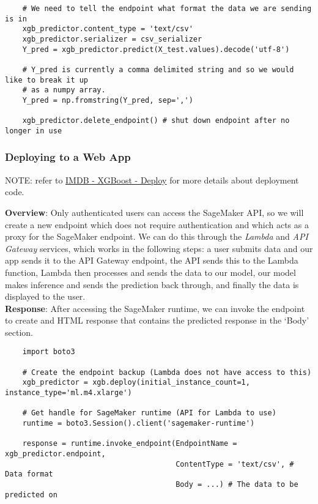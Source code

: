 \documentclass[11pt, a4paper]{article}
\begin{document}
\begin{spacing}{1.1}
\begin{lstlisting}
	# We need to tell the endpoint what format the data we are sending is in
	xgb_predictor.content_type = 'text/csv'
	xgb_predictor.serializer = csv_serializer
	Y_pred = xgb_predictor.predict(X_test.values).decode('utf-8')
	
	# Y_pred is currently a comma delimited string and so we would like to break it up
	# as a numpy array.
	Y_pred = np.fromstring(Y_pred, sep=',')
	
	xgb_predictor.delete_endpoint() # shut down endpoint after no longer in use
	\end{lstlisting} \vspace*{1mm}
	
	\subsubsection{Deploying to a Web App}
	\begin{center}
	\color{darkgray} NOTE: refer to \href{file:///E:/Documents/UdacityNotes/ML\%20Engineer/sample\_code/IMDB\%20-\%20XGBoost\%20-\%20Deploy.html}{IMDB - XGBoost - Deploy} for more details about deployment code. \color{black}
	\end{center}
	\textbf{Overview}: Only authenticated users can access the SageMaker API, so we will create a new endpoint which does not require authentication and which acts as a proxy for the SageMaker endpoint. We can do this through the \textit{Lambda} and \textit{API Gateway} services, which works in the following steps: a user submits data and our app sends it to the API Gateway endpoint, the API sends this to the Lambda function, Lambda then processes and sends the data to our model, our model makes inference and sends the prediction back through, and finally the data is displayed to the user. \vspace*{2mm}\\
	\textbf{Response}: After accessing the SageMaker runtime, we can invoke the endpoint to create and HTML response that contains the predicted response in the `Body' section. 
	\begin{lstlisting}
	import boto3
	
	# Create the endpoint backup (Lambda does not have access to this)
	xgb_predictor = xgb.deploy(initial_instance_count=1, instance_type='ml.m4.xlarge')
	
	# Get handle for SageMaker runtime (API for Lambda to use)
	runtime = boto3.Session().client('sagemaker-runtime')
	
	response = runtime.invoke_endpoint(EndpointName = xgb_predictor.endpoint,
	                                   ContentType = 'text/csv', # Data format
	                                   Body = ...) # The data to be predicted on
	

\end{lstlisting}
\end{spacing}
\end{document}
